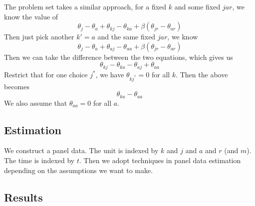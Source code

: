 \documentclass[12pt]{article}[margin=1in]
\begin{document}
The problem set takes a similar approach, for a fixed $k$ and some fixed $jar$, we know the value of
$$ \theta_{j} - \theta_{a} + \theta_{kj} -\theta_{ka} + \beta(\theta_{jr} - \theta_{ar})$$
Then just pick another $k'= a$ and the same fixed $jar$, we know 
$$ \theta_{j} - \theta_{a} + \theta_{aj} - \theta_{aa} + \beta(\theta_{jr} - \theta_{ar})$$
Then we can take the difference between the two equations, which gives us
$$ \theta_{kj} - \theta_{ka} - \theta_{aj} + \theta_{aa} $$
Restrict that for one choice $j^*$, we have $\theta_{kj^*} = 0$ for all $k$. Then the above becomes $$ \theta_{ka} - \theta_{aa}$$
We also assume that $\theta_{aa} = 0$ for all $a$. 

\subsection{Estimation}
We construct a panel data. The unit is indexed by $k$ and $j$ and $a$ and $r$ (and $m$). The time is indexed by $t$. Then we adopt techniques in panel data estimation depending on the assumptions we want to make. 


\subsection{Results}
\end{document}
